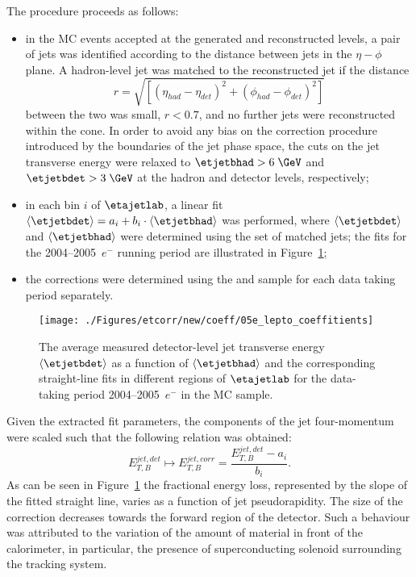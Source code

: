 The procedure proceeds as follows:
\begin{itemize}
 \item in the MC events accepted at the generated and reconstructed levels, a pair of jets was identified according to the distance between jets in the $\eta-\phi$ plane. A hadron-level jet was matched to the reconstructed jet if the distance 
\begin{equation}
r=\sqrt{\left[\left(\eta_{had}-\eta_{det}\right)^2 + \left(\phi_{had}-\phi_{det}\right)^2\right]}
\end{equation}
between the two was small, $r<0.7$, and no further jets were reconstructed within the cone. In order to avoid any bias on the correction procedure introduced by the boundaries of the jet phase space, the cuts on the jet transverse energy were relaxed to $\etjetbhad>6\;\GeV$ and $\etjetbdet>3\;\GeV$ at the hadron and detector levels, respectively;
 \item in each bin $i$ of $\etajetlab$, a linear fit $\left\langle\etjetbdet\right\rangle = a_i + b_i\cdot\left\langle\etjetbhad\right\rangle$ was performed, where $\left\langle\etjetbdet\right\rangle$ and $\left\langle\etjetbhad\right\rangle$ were determined using the set of matched jets; the fits for the 2004--2005~$e^-$ running period are illustrated in Figure~\ref{fig:05e_lepto_coeffitients};
 \item the corrections were determined using the \ariadne and \lepto sample for each data taking period separately. 
\end{itemize}
\begin{figure}[p]
\centering
\texttt{[image: ./Figures/etcorr/new/coeff/05e\_lepto\_coeffitients]}
\caption{The average measured detector-level jet transverse energy $\left\langle\etjetbdet\right\rangle$ as a function of $\left\langle\etjetbhad\right\rangle$ and the corresponding straight-line fits in different regions of $\etajetlab$ for the data-taking period 2004--2005~$e^-$ in the \lepto MC sample.}
\label{fig:05e_lepto_coeffitients}
\end{figure}

Given the extracted fit parameters, the components of the jet four-momentum were scaled such that the following relation was obtained:
 \begin{equation}
  E_{T,B}^{jet,det} \mapsto E_{T,B}^{jet,corr} = \frac{E_{T,B}^{jet,det} - a_i}{b_i}.
 \end{equation}
As can be seen in Figure~\ref{fig:05e_lepto_coeffitients} the fractional energy loss, represented by the slope of the fitted straight line, varies as a function of jet pseudorapidity. The size of the correction decreases towards the forward region of the detector. Such a behaviour was attributed to the variation of the amount of material in front of the calorimeter, in particular, the presence of superconducting solenoid surrounding the tracking system. 

